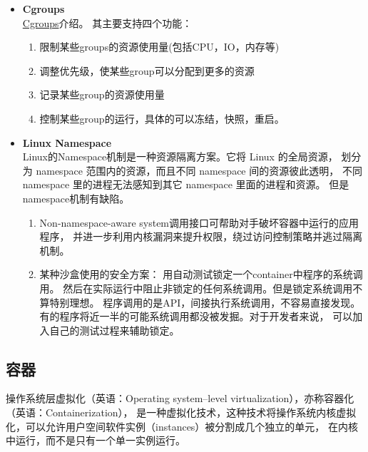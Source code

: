 \documentclass[AutoFakeBold,a4paper]{ctexart}
\begin{document}
\begin{enumerate}
\begin{itemize}
    \item \textbf{Cgroups}\\
    \href{https://en.wikipedia.org/wiki/Cgroups}{Cgroups}介绍。
    其主要支持四个功能：
    \begin{enumerate}
        \item 限制某些groups的资源使用量(包括CPU，IO，内存等)
        \item 调整优先级，使某些group可以分配到更多的资源
        \item 记录某些group的资源使用量
        \item 控制某些group的运行，具体的可以冻结，快照，重启。
    \end{enumerate}

    \item \textbf{Linux Namespace}\\
    Linux的Namespace机制是一种资源隔离方案。它将 Linux 的全局资源，
    划分为 namespace 范围内的资源，而且不同 namespace 间的资源彼此透明，
    不同 namespace 里的进程无法感知到其它 namespace 里面的进程和资源。
    但是namespace机制有缺陷。
    \begin{enumerate}
        \item Non-namespace-aware system调用接口可帮助对手破坏容器中运行的应用程序，
        并进一步利用内核漏洞来提升权限，绕过访问控制策略并逃过隔离机制。\cite{2019Practical}
        \item 某种沙盒使用的安全方案\cite{2019Practical}：
        用自动测试锁定一个container中程序的系统调用。
        然后在实际运行中阻止非锁定的任何系统调用。但是锁定系统调用不算特别理想。
        程序调用的是API，间接执行系统调用，不容易直接发现。
        有的程序将近一半的可能系统调用都没被发掘。对于开发者来说，
        可以加入自己的测试过程来辅助锁定。
    \end{enumerate}

\end{itemize}

\end{enumerate}

\subsection{容器}
操作系统层虚拟化（英语：Operating system–level virtualization），亦称容器化（英语：Containerization），
是一种虚拟化技术，这种技术将操作系统内核虚拟化，可以允许用户空间软件实例（instances）被分割成几个独立的单元，
在内核中运行，而不是只有一个单一实例运行。
\end{document}
